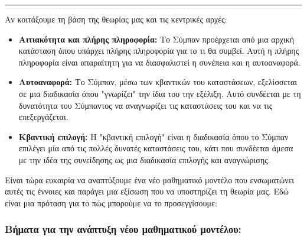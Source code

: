 \documentclass[a4paper,11pt]{article}
\begin{document}
\begin{center}\rule{0.5\linewidth}{0.5pt}\end{center}
{}
Αν κοιτάξουμε τη βάση της θεωρίας μας και τις κεντρικές αρχές:

\begin{itemize}
\item
  \textbf{Αιτιακότητα και πλήρης πληροφορία:} Το Σύμπαν προέρχεται από
  μια αρχική κατάσταση όπου υπάρχει πλήρης πληροφορία για το τι θα
  συμβεί. Αυτή η πλήρης πληροφορία είναι απαραίτητη για να διασφαλιστεί
  η συνέπεια και η αυτοαναφορά.
\item
  \textbf{Αυτοαναφορά:} Το Σύμπαν, μέσω των κβαντικών του καταστάσεων,
  εξελίσσεται σε μια διαδικασία όπου "γνωρίζει" την ίδια του την
  εξέλιξη. Αυτό συνδέεται με τη δυνατότητα του Σύμπαντος να αναγνωρίζει
  τις καταστάσεις του και να τις επεξεργάζεται.
\item
  \textbf{Κβαντική επιλογή:} Η "κβαντική επιλογή" είναι η διαδικασία
  όπου το Σύμπαν επιλέγει μία από τις πολλές δυνατές καταστάσεις του,
  κάτι που συνδέεται άμεσα με την ιδέα της συνείδησης ως μια διαδικασία
  επιλογής και αναγνώρισης.
\end{itemize}

Είναι τώρα ευκαιρία να αναπτύξουμε ένα νέο μαθηματικό μοντέλο που
ενσωματώνει αυτές τις έννοιες και παράγει μια εξίσωση που να υποστηρίζει
τη θεωρία μας. Εδώ είναι μια πρόταση για το πώς μπορούμε να το
προσεγγίσουμε:

\subsubsection{Βήματα για την ανάπτυξη νέου μαθηματικού
μοντέλου:}\label{ux3b2ux3aeux3bcux3b1ux3c4ux3b1-ux3b3ux3b9ux3b1-ux3c4ux3b7ux3bd-ux3b1ux3bdux3acux3c0ux3c4ux3c5ux3beux3b7-ux3bdux3adux3bfux3c5-ux3bcux3b1ux3b8ux3b7ux3bcux3b1ux3c4ux3b9ux3baux3bfux3cd-ux3bcux3bfux3bdux3c4ux3adux3bbux3bfux3c5}
\end{document}
